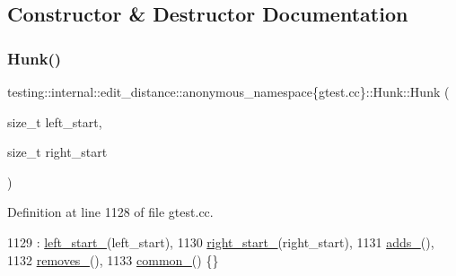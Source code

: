 \subsection{Constructor \& Destructor Documentation}
\mbox{\label{classtesting_1_1internal_1_1edit__distance_1_1anonymous__namespace_02gtest_8cc_03_1_1Hunk_a16c5bd884105b1d61b1ada25ab5bef74}} 
\subsubsection{\texorpdfstring{Hunk()}{Hunk()}}
{\footnotesize\ttfamily testing\+::internal\+::edit\+\_\+distance\+::anonymous\+\_\+namespace\{gtest.\+cc\}\+::Hunk\+::\+Hunk (\begin{DoxyParamCaption}\item[{size\+\_\+t}]{left\+\_\+start,  }\item[{size\+\_\+t}]{right\+\_\+start }\end{DoxyParamCaption})\hspace{0.3cm}{\ttfamily [inline]}}



Definition at line 1128 of file gtest.\+cc.


\begin{DoxyCode}
1129       : \hyperlink{classtesting_1_1internal_1_1edit__distance_1_1anonymous__namespace_02gtest_8cc_03_1_1Hunk_a735e2ea405bdd59b97bbdcbd9401009a}{left\_start\_}(left\_start),
1130         \hyperlink{classtesting_1_1internal_1_1edit__distance_1_1anonymous__namespace_02gtest_8cc_03_1_1Hunk_a8300f282fe8060dadaedb15dd00fdb33}{right\_start\_}(right\_start),
1131         \hyperlink{classtesting_1_1internal_1_1edit__distance_1_1anonymous__namespace_02gtest_8cc_03_1_1Hunk_aebe5a95d3f4d959662f95e4d6b759c87}{adds\_}(),
1132         \hyperlink{classtesting_1_1internal_1_1edit__distance_1_1anonymous__namespace_02gtest_8cc_03_1_1Hunk_afef2d4c5c0b9cb9567d4f778f6748828}{removes\_}(),
1133         \hyperlink{classtesting_1_1internal_1_1edit__distance_1_1anonymous__namespace_02gtest_8cc_03_1_1Hunk_a027909c2722c8549d8ca490ffa14b134}{common\_}() \{\}
\end{DoxyCode}


